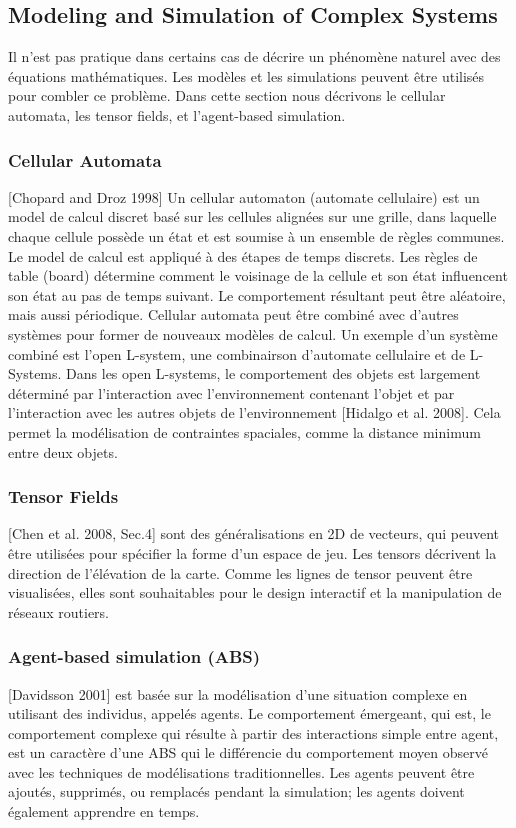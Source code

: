 \documentclass[11pt]{report}
\begin{document}
\subsection{Modeling and Simulation of Complex Systems}

Il n'est pas pratique dans certains cas de décrire un phénomène naturel avec des équations mathématiques. Les modèles et les simulations peuvent être utilisés pour combler ce problème. Dans cette section nous décrivons le cellular automata, les tensor fields, et l'agent-based simulation.

\subsubsection{Cellular Automata} [Chopard and Droz 1998] Un cellular automaton (automate cellulaire) est un model de calcul discret basé sur les cellules alignées sur une grille, dans laquelle chaque cellule possède un état et est soumise à un ensemble de règles communes. Le model de calcul est appliqué à des étapes de temps discrets. Les règles de table (board) détermine comment le voisinage de la cellule et son état influencent son état au pas de temps suivant. Le comportement résultant peut être aléatoire, mais aussi périodique.
Cellular automata peut être combiné avec d'autres systèmes pour former de nouveaux modèles de calcul. Un exemple d'un système combiné est l'open L-system, une combinairson d'automate cellulaire et de L-Systems. Dans les open L-systems, le comportement des objets est largement déterminé par l'interaction avec l'environnement contenant l'objet et par l'interaction avec les autres objets de l'environnement [Hidalgo et al. 2008]. Cela permet la modélisation de contraintes spaciales, comme la distance minimum entre deux objets.

\subsubsection{Tensor Fields} [Chen et al. 2008, Sec.4] sont des généralisations en 2D de vecteurs, qui peuvent être utilisées pour spécifier la forme d'un espace de jeu. Les tensors décrivent la direction de l'élévation de la carte. Comme les lignes de tensor peuvent être visualisées, elles sont souhaitables pour le design interactif et la manipulation de réseaux routiers.

\subsubsection{Agent-based simulation (ABS)} [Davidsson 2001] est basée sur la modélisation d'une situation complexe en utilisant des individus, appelés agents. Le comportement émergeant, qui est, le comportement complexe qui résulte à partir des interactions simple entre agent, est un caractère d'une ABS qui le différencie du comportement moyen observé avec les techniques de modélisations traditionnelles. Les agents peuvent être ajoutés, supprimés, ou remplacés pendant la simulation; les agents doivent également apprendre en temps.
\end{document}
